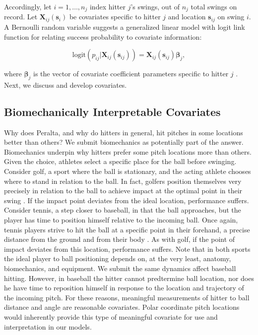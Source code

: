 \documentclass{article}
\begin{document}
Accordingly, let $i = 1, \dots, n_{j}$ index hitter $j$'s swings, out of $n_{j}$ total swings on record. Let $\pmb{X}_{ij}(\pmb{s}_{i})$ be covariates specific to hitter $j$ and location $\pmb{s}_{ij}$ on swing $i$. A Bernoulli random variable suggests a generalized linear model with logit link function for relating success probability to covariate information: 

\begin{equation}
\text{logit}(p_{ij}|\pmb{X}_{ij}(\pmb{s}_{ij})) = \pmb{X}_{ij}(\pmb{s}_{ij}) \pmb{\beta}_{j},
\end{equation}

where $\pmb{\beta}_{j}$ is the vector of covariate coefficient parameters specific to hitter $j$ \citep{Myers2012}. Next, we discuss and develop covariates.

\subsection{Biomechanically Interpretable Covariates} %

Why does Peralta, and why do hitters in general, hit pitches in some locations better than others? We submit biomechanics as potentially part of the answer. Biomechanics underpin why hitters prefer some pitch locations more than others. Given the choice, athletes select a specific place for the ball before swinging. Consider golf, a sport where the ball is stationary, and the acting athlete chooses where to stand in relation to the ball. In fact, golfers position themselves very precisely in relation to the ball to achieve impact at the optimal point in their swing \citep{Cochran2005}. If the impact point deviates from the ideal location, performance suffers. Consider tennis, a step closer to baseball, in that the ball approaches, but the player has time to position himself relative to the incoming ball. Once again, tennis players strive to hit the ball at a specific point in their forehand, a precise distance from the ground and from their body \citep{Elliott2006}. As with golf, if the point of impact deviates from this location, performance suffers. Note that in both sports the ideal player to ball positioning depends on, at the very least, anatomy, biomechanics, and equipment. We submit the same dynamics affect baseball hitting. However, in baseball the hitter cannot predtermine ball location, nor does he have time to reposition himself in response to the location and trajectory of the incoming pitch. For these reasons, meaningful measurements of hitter to ball distance and angle are reasonable covariates. Polar coordinate pitch locations would inherently provide this type of meaningful covariate for use and interpretation in our models. 
\end{document}
